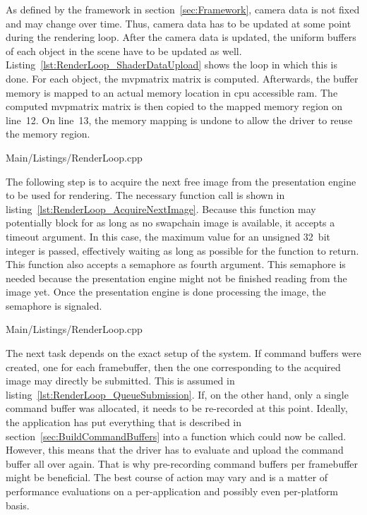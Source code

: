     As defined by the framework in section~\ref{sec:Framework}, camera data is not fixed and may change over time.
    Thus, camera data has to be updated at some point during the rendering loop.
    After the camera data is updated, the uniform buffers of each object in the scene have to be updated as well.
    Listing~\ref{lst:RenderLoop_ShaderDataUpload} shows the loop in which this is done.
    For each object, the \gls{mvpmatrix} matrix is computed.
    Afterwards, the buffer memory is mapped to an actual memory location in \gls{cpu} accessible \gls{ram}.
    The computed \gls{mvpmatrix} matrix is then copied to the mapped memory region on line~12.
    On line~13, the memory mapping is undone to allow the \gls{driver} to reuse the memory region.

    
    {Main/Listings/RenderLoop.cpp}

    The following step is to acquire the next free image from the presentation engine to be used for rendering.
    The necessary function call is shown in listing~\ref{lst:RenderLoop_AcquireNextImage}.
    Because this function may potentially block for as long as no swapchain image is available, it accepts a timeout argument.
    In this case, the maximum value for an unsigned 32~bit integer is passed, effectively waiting as long as possible for the function to return.
    This function also accepts a semaphore as fourth argument.
    This semaphore is needed because the presentation engine might not be finished reading from the image yet.
    Once the presentation engine is done processing the image, the semaphore is signaled.

    
    {Main/Listings/RenderLoop.cpp}

    The next task depends on the exact setup of the system.
    If command buffers were created, one for each framebuffer, then the one corresponding to the acquired image may directly be submitted.
    This is assumed in listing~\ref{lst:RenderLoop_QueueSubmission}.
    If, on the other hand, only a single command buffer was allocated, it needs to be re-recorded at this point.
    Ideally, the application has put everything that is described in section~\ref{sec:BuildCommandBuffers} into a function which could now be called.
    However, this means that the \gls{driver} has to evaluate and upload the command buffer all over again.
    That is why pre-recording command buffers per framebuffer might be beneficial.
    The best course of action may vary and is a matter of performance evaluations on a per-application and possibly even per-platform basis.

